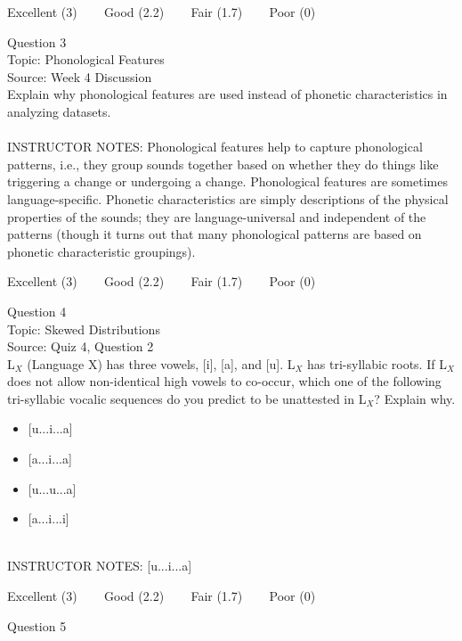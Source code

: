 \documentclass[12pt]{article}
\begin{document}
\vfill
Excellent (3) ~~~ Good (2.2) ~~~ Fair (1.7) ~~~ Poor (0)
\newpage

{\large Question 3}\\

Topic: Phonological Features\\
Source: Week 4 Discussion\\

Explain why phonological features are used instead of phonetic characteristics in analyzing datasets.\\


~\\
INSTRUCTOR NOTES: Phonological features help to capture phonological patterns, i.e., they group sounds together based on whether they do things like triggering a change or undergoing a change. Phonological features are sometimes language-specific. Phonetic characteristics are simply descriptions of the physical properties of the sounds; they are language-universal and independent of the patterns (though it turns out that many phonological patterns are based on phonetic characteristic groupings).


\vfill
Excellent (3) ~~~ Good (2.2) ~~~ Fair (1.7) ~~~ Poor (0)
\newpage

{\large Question 4}\\

Topic: Skewed Distributions\\
Source: Quiz 4, Question 2\\

L$_X$ (Language X) has three vowels, [i], [a], and [u]. L$_X$ has tri-syllabic roots. If L$_X$ does not allow non-identical high vowels to co-occur, which one of the following tri-syllabic vocalic sequences do you predict to be unattested in L$_X$? Explain why.\\

\begin{itemize} \item {[u...i...a]} \item {[a...i...a]} \item {[u...u...a]} \item {[a...i...i]} \end{itemize}


~\\
INSTRUCTOR NOTES: [u...i...a]


\vfill
Excellent (3) ~~~ Good (2.2) ~~~ Fair (1.7) ~~~ Poor (0)
\newpage

{\large Question 5}\\
\end{document}
